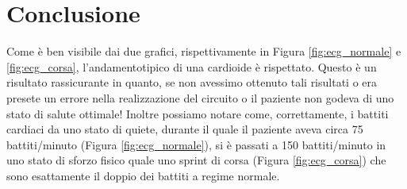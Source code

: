 \section*{Conclusione}

Come è ben visibile dai due grafici, rispettivamente in Figura \ref{fig:ecg_normale} e \ref{fig:ecg_corsa}, l'andamentotipico di una cardioide è rispettato. Questo è un risultato rassicurante in quanto, se non avessimo ottenuto tali risultati o era presete un errore nella realizzazione del circuito o il paziente non godeva di uno stato di salute ottimale!
Inoltre possiamo notare come, correttamente, i battiti cardiaci da uno stato di quiete, durante il quale il paziente aveva circa 75 battiti/minuto (Figura \ref{fig:ecg_normale}), si è passati a 150 battiti/minuto in uno stato di sforzo fisico quale uno sprint di corsa (Figura \ref{fig:ecg_corsa}) che sono esattamente il doppio dei battiti a regime normale. 